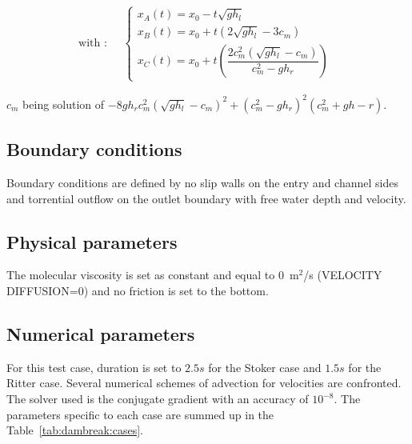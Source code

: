 \begin{equation}
\text{with :} \quad \begin{split}\begin{cases}
x_A(t) = x_0 - t \sqrt{g h_l} \\
x_B(t) = x_0 + t \left( 2 \sqrt{gh_l} - 3c_m \right) \\
x_C(t) = x_0 + t \left( \dfrac{2c_m^2 \left( \sqrt{gh_l} - c_m \right)}{c_m^2-g h_r} \right)
\end{cases}\end{split}
\end{equation}

$c_m$ being solution of $-8g h_r c_m^2 (\sqrt{gh_l}-c_m)^2+(c_m^2-gh_r)^2(c_m^2+gh-r)$.

\subsection{Boundary conditions}
Boundary conditions are defined by no slip walls on the entry and channel sides and torrential outflow on the outlet boundary
with free water depth and velocity.

%
\subsection{Physical parameters}
%
The molecular viscosity is set as constant and equal to 0~m$^2$/s (VELOCITY DIFFUSION=0) and
no friction is set to the bottom.

\subsection{Numerical parameters}

For this test case, duration is set to $2.5s$ for the Stoker case and $1.5s$ for the Ritter case.
Several numerical schemes of advection for velocities are confronted.
The solver used is the conjugate gradient with an accuracy of $10^{-8}$.
The parameters specific to each case are summed up in the Table~\ref{tab:dambreak:cases}.
\begin{table}[H]
  \caption{List of the simulation parameters used for the six cases tested in the Ritter and Stokes cases.}
  \label{tab:dambreak:cases}
\end{table}
%

